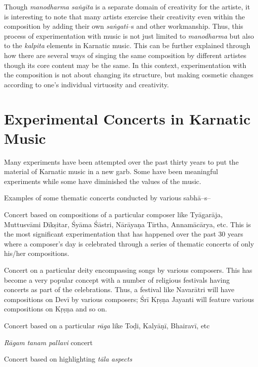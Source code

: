 Though \textit{manodharma saṅgīta} is a separate domain of creativity for the artiste, it is interesting to note that many artists exercise their creativity even within the composition by adding their own \textit{saṅgati}–s and other workmanship. Thus, this process of experimentation with music is not just limited to \textit{manodharma} but also to the \textit{kalpita} elements in Karnatic music. This can be further explained through how there are several ways of singing the same composition by different artistes though its core content may be the same. In this context, experimentation with the composition is not about changing its structure, but making cosmetic changes according to one’s individual virtuosity and creativity.


\section*{Experimental Concerts in Karnatic Music}

Many experiments have been attempted over the past thirty years to put the material of Karnatic music in a new garb. Some have been meaningful experiments while some have diminished the values of the music.

Examples of some thematic concerts conducted by various sabhā–s– 

\item Concert based on compositions of a particular composer like Tyāgarāja, Muttusvāmi Dīkṣitar, Śyāma Śāstri, Nārāyaṇa Tīrtha, Annamācārya, etc. This is the most significant experimentation that has happened over the past 30 years where a composer’s day is celebrated through a series of thematic concerts of only his/her compositions.

 \item Concert on a particular deity encompassing songs by various composers. This has become a very popular concept with a number of religious festivals having concerts as part of the celebrations. Thus, a festival like Navarātri will have compositions on Devī by various composers; Śrī Kṛṣṇa Jayanti will feature various compositions on Kṛṣṇa and so on.

 \item Concert based on a particular \textit{rāga} like Toḍi, Kalyāṇī, Bhairavī, etc

 \item \textit{Rāgam tanam pallavi} concert

 \item Concert based on highlighting \textit{tāla aspects}

